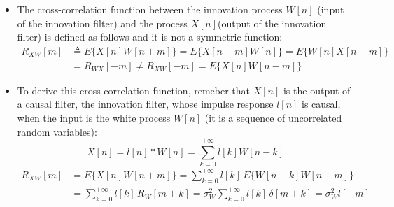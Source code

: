 \begin{itemize}
\item The cross-correlation function between the innovation process \(W[n]\) (input of the innovation filter) and the process \(X[n]\)(output of the innovation filter) is defined as follows and it is not a symmetric function:
\begin{align*}
R_{XW}[m]
&\triangleq E\{X[n]W[n+m]\}
 = E\{X[n-m]W[n]\}
 = E\{W[n]X[n-m]\} \\[4pt]
&= R_{WX}[-m] \ne R_{XW}[-m]
 = E\{X[n]W[n-m]\}
\end{align*}

\item To derive this cross-correlation function, remeber that \(X[n]\) is the output of a causal filter, the innovation filter, whose impulse response \(l[n]\) is causal, when the input is the white process \(W[n]\) (it is a sequence of uncorrelated random variables):
\[
X[n]=l[n]*W[n]=\sum_{k=0}^{+\infty}l[k]W[n-k]
\]
\vspace{-0.5em}
\begin{align*}
R_{XW}[m]
&= E\{X[n]W[n+m]\}
 = \sum_{k=0}^{+\infty} l[k]\,
    E\{W[n-k]W[n+m]\} \\[4pt]
&= \sum_{k=0}^{+\infty} l[k]\,
    R_{W}[m+k]
 = \sigma_{W}^{2} \sum_{k=0}^{+\infty} l[k]\,
    \delta[m+k]
 = \sigma_{W}^{2} l[-m]
\end{align*}


\end{itemize}
